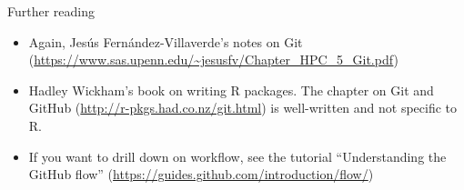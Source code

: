 \documentclass{beamer}
\begin{document}
\begin{frame}{Further reading}
\begin{itemize}
\item Again, Jes\'us Fern\'andez-Villaverde's notes on Git (\url{https://www.sas.upenn.edu/~jesusfv/Chapter_HPC_5_Git.pdf})
\item Hadley Wickham's book on writing R packages. The chapter on Git and GitHub (\url{http://r-pkgs.had.co.nz/git.html}) is well-written and not specific to R.
\item If you want to drill down on workflow, see the tutorial ``Understanding the GitHub flow'' (\url{https://guides.github.com/introduction/flow/})
\end{itemize}
\end{frame}
\end{document}
